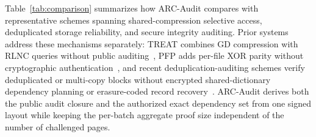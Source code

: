 \documentclass[10pt,journal]{IEEEtran}
\begin{document}
Table~\ref{tab:comparison} summarizes how ARC-Audit compares with representative schemes spanning shared-compression selective access, deduplicated storage reliability, and secure integrity auditing. Prior systems address these mechanisms separately: TREAT combines GD compression with RLNC queries without public auditing~\cite{Taurone2024TREAT}, PFP adds per-file XOR parity without cryptographic authentication~\cite{Wu2019PFP}, and recent deduplication-auditing schemes verify deduplicated or multi-copy blocks without encrypted shared-dictionary dependency planning or erasure-coded record recovery~\cite{Miao2024SharedAudit,Miao2025,Liu2025FineGrained,Pan2026,Xu2026MPA}. ARC-Audit derives both the public audit closure and the authorized exact dependency set from one signed layout while keeping the per-batch aggregate proof size independent of the number of challenged pages.
\end{document}
